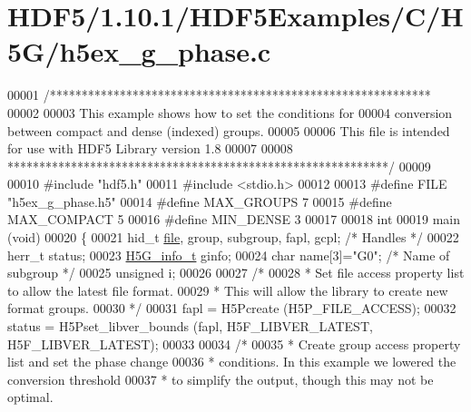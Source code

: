 \hypertarget{_h_d_f5_21_810_81_2_h_d_f5_examples_2_c_2_h5_g_2h5ex__g__phase_8c_source}{}\section{H\+D\+F5/1.10.1/\+H\+D\+F5\+Examples/\+C/\+H5\+G/h5ex\+\_\+g\+\_\+phase.c}
\label{_h_d_f5_21_810_81_2_h_d_f5_examples_2_c_2_h5_g_2h5ex__g__phase_8c_source}

\begin{DoxyCode}
00001 \textcolor{comment}{/************************************************************}
00002 \textcolor{comment}{}
00003 \textcolor{comment}{  This example shows how to set the conditions for}
00004 \textcolor{comment}{  conversion between compact and dense (indexed) groups.}
00005 \textcolor{comment}{}
00006 \textcolor{comment}{  This file is intended for use with HDF5 Library version 1.8}
00007 \textcolor{comment}{}
00008 \textcolor{comment}{ ************************************************************/}
00009 
00010 \textcolor{preprocessor}{#include "hdf5.h"}
00011 \textcolor{preprocessor}{#include <stdio.h>}
00012 
00013 \textcolor{preprocessor}{#define FILE        "h5ex\_g\_phase.h5"}
00014 \textcolor{preprocessor}{#define MAX\_GROUPS  7}
00015 \textcolor{preprocessor}{#define MAX\_COMPACT 5}
00016 \textcolor{preprocessor}{#define MIN\_DENSE   3}
00017 
00018 \textcolor{keywordtype}{int}
00019 main (\textcolor{keywordtype}{void})
00020 \{
00021     hid\_t       \hyperlink{structfile}{file}, group, subgroup, fapl, gcpl;      \textcolor{comment}{/* Handles */}
00022     herr\_t      status;
00023     \hyperlink{struct_h5_g__info__t}{H5G\_info\_t}  ginfo;
00024     \textcolor{keywordtype}{char}        name[3]=\textcolor{stringliteral}{"G0"};                  \textcolor{comment}{/* Name of subgroup */}
00025     \textcolor{keywordtype}{unsigned}    i;
00026 
00027     \textcolor{comment}{/*}
00028 \textcolor{comment}{     * Set file access property list to allow the latest file format.}
00029 \textcolor{comment}{     * This will allow the library to create new format groups.}
00030 \textcolor{comment}{     */}
00031     fapl = H5Pcreate (H5P\_FILE\_ACCESS);
00032     status = H5Pset\_libver\_bounds (fapl, H5F\_LIBVER\_LATEST, H5F\_LIBVER\_LATEST);
00033 
00034     \textcolor{comment}{/*}
00035 \textcolor{comment}{     * Create group access property list and set the phase change}
00036 \textcolor{comment}{     * conditions.  In this example we lowered the conversion threshold}
00037 \textcolor{comment}{     * to simplify the output, though this may not be optimal.}

\end{DoxyCode}
